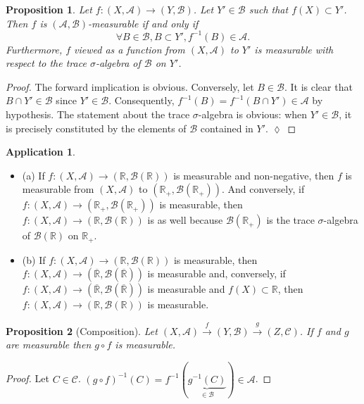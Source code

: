 \documentclass[11pt]{article}
\newtheorem{proposition}{Proposition}[section]
\theoremstyle{definition}
\newtheorem{application}{Application}[section]
\begin{document}
\begin{proposition}
Let $f : (X, \mathscr{A}) \to (Y, \mathscr{B})$. Let $Y' \in \mathscr{B}$ such that $f(X) \subset Y'$. Then $f$ is $(\mathscr{A}, \mathscr{B})$-measurable if and only if
$$ \forall B \in \mathscr{B}, B \subset Y', f^{-1}(B) \in \mathscr{A}. $$
Furthermore, $f$ viewed as a function from $(X, \mathscr{A})$ to $Y'$ is measurable with respect to the trace $\sigma$-algebra of $\mathscr{B}$ on $Y'$.
\end{proposition}
\begin{proof}
    The forward implication is obvious.
    Conversely, let $B \in \mathscr{B}$. It is clear that $B \cap Y' \in \mathscr{B}$ since $Y' \in \mathscr{B}$. Consequently, $f^{-1}(B) = f^{-1}(B \cap Y') \in \mathscr{A}$ by hypothesis. The statement about the trace $\sigma$-algebra is obvious: when $Y' \in \mathscr{B}$, it is precisely constituted by the elements of $\mathscr{B}$ contained in $Y'$. $\lozenge$
\end{proof}

\begin{application}
    \begin{itemize}
    \item (a) If $f : (X, \mathscr{A}) \to (\mathbb{R}, \mathscr{B}(\mathbb{R}))$ is measurable and non-negative, then $f$ is measurable from $(X, \mathscr{A})$ to $(\mathbb{R}_+, \mathscr{B}(\mathbb{R}_+))$. And conversely, if $f : (X, \mathscr{A}) \to (\mathbb{R}_+, \mathscr{B}(\mathbb{R}_+))$ is measurable, then $f : (X, \mathscr{A}) \to (\mathbb{R}, \mathscr{B}(\mathbb{R}))$ is as well because $\mathscr{B}(\mathbb{R}_+)$ is the trace $\sigma$-algebra of $\mathscr{B}(\mathbb{R})$ on $\mathbb{R}_+$.

\item (b) If $f : (X, \mathscr{A}) \to (\mathbb{R}, \mathscr{B}(\mathbb{R}))$ is measurable, then $f : (X, \mathscr{A}) \to (\overline{\mathbb{R}}, \mathscr{B}(\overline{\mathbb{R}}))$ is measurable and, conversely, if $f : (X, \mathscr{A}) \to (\overline{\mathbb{R}}, \mathscr{B}(\overline{\mathbb{R}}))$ is measurable and $f(X) \subset \mathbb{R}$, then $f : (X, \mathscr{A}) \to (\mathbb{R}, \mathscr{B}(\mathbb{R}))$ is measurable.
\end{itemize}
\end{application}

\begin{proposition}[Composition]
    Let $(X, \mathscr{A}) \xrightarrow{f} (Y, \mathscr{B}) \xrightarrow{g} (Z, \mathscr{C})$. If $f$ and $g$ are measurable then $g \circ f$ is measurable.
\end{proposition}
\begin{proof}
	Let $C \in \mathscr{C}$. $(g \circ f)^{-1}(C) = f^{-1}(\underbrace{g^{-1}(C)}_{\in \mathscr{B}}) \in \mathscr{A}$. 
\end{proof}
\end{document}
